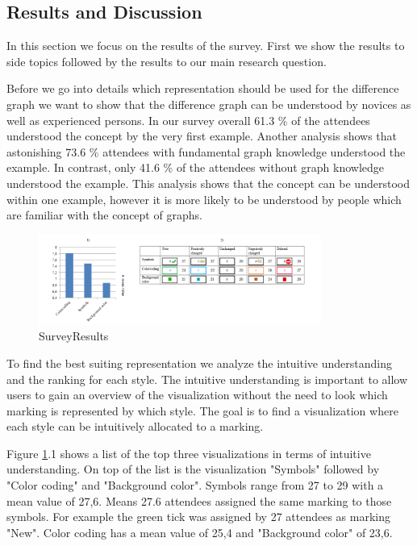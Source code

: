 \documentclass{llncs}
\begin{document}
\subsection{Results and Discussion} %
\label{sec:Results}
In this section we focus on the results of the survey. First we show the results to side topics followed by the results to our main research question.

Before we go into details which representation should be used for the difference graph we want to show that the difference graph can be understood by novices as well as experienced persons. In our survey overall 61.3 \% of the attendees understood the concept by the very first example. Another analysis shows that astonishing 73.6 \% attendees with fundamental graph knowledge understood the example. In contrast, only 41.6 \% of the attendees without graph knowledge understood the example. This analysis shows that the concept can be understood within one example, however it is more likely to be understood by people which are familiar with the concept of graphs.

\begin{figure}
	\centering
	\includegraphics[width=350px]{Images/Results.PNG}
	\caption{SurveyResults}
	\label{fig:SurveyResults}
\end{figure}

To find the best suiting representation we analyze the intuitive understanding and the ranking for each style. The intuitive understanding is important to allow users to gain an overview of the visualization without the need to look which marking is represented by which style. The goal is to find a visualization where each style can be intuitively allocated to a marking.

Figure \ref{fig:SurveyResults}.1 shows a list of the top three visualizations in terms of intuitive understanding. On top of the list is the visualization "Symbols" followed by "Color coding" and "Background color". Symbols range from 27 to 29 with a mean value of 27,6. Means 27.6 attendees assigned the same marking to those symbols. For example the green tick was assigned by 27 attendees as marking "New". Color coding has a mean value of 25,4 and "Background color" of 23,6.
\end{document}
